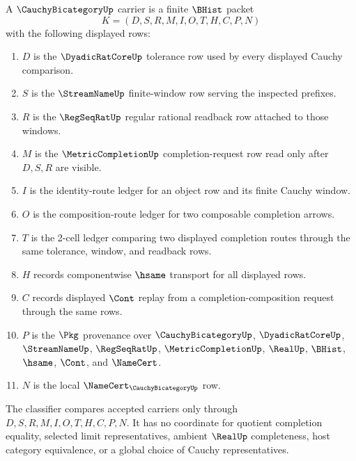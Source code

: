 \begin{definition}
\label{def:cauchy-bicategory-carrier}
A $\CauchyBicategoryUp$ carrier is a finite $\BHist$ packet
$$
K=(D,S,R,M,I,O,T,H,C,P,N)
$$
with the following displayed rows:
\begin{enumerate}
\item $D$ is the $\DyadicRatCoreUp$ tolerance row used by every displayed Cauchy comparison.
\item $S$ is the $\StreamNameUp$ finite-window row serving the inspected prefixes.
\item $R$ is the $\RegSeqRatUp$ regular rational readback row attached to those windows.
\item $M$ is the $\MetricCompletionUp$ completion-request row read only after $D,S,R$ are visible.
\item $I$ is the identity-route ledger for an object row and its finite Cauchy window.
\item $O$ is the composition-route ledger for two composable completion arrows.
\item $T$ is the 2-cell ledger comparing two displayed completion routes through the same tolerance, window, and readback rows.
\item $H$ records componentwise $\hsame$ transport for all displayed rows.
\item $C$ records displayed $\Cont$ replay from a completion-composition request through the same rows.
\item $P$ is the $\Pkg$ provenance over $\CauchyBicategoryUp$, $\DyadicRatCoreUp$, $\StreamNameUp$, $\RegSeqRatUp$, $\MetricCompletionUp$, $\RealUp$, $\BHist$, $\hsame$, $\Cont$, and $\NameCert$.
\item $N$ is the local $\NameCert_{\CauchyBicategoryUp}$ row.
\end{enumerate}
The classifier compares accepted carriers only through $D,S,R,M,I,O,T,H,C,P,N$. It has no coordinate for quotient completion equality, selected limit representatives, ambient $\RealUp$ completeness, host category equivalence, or a global choice of Cauchy representatives.
\end{definition}

